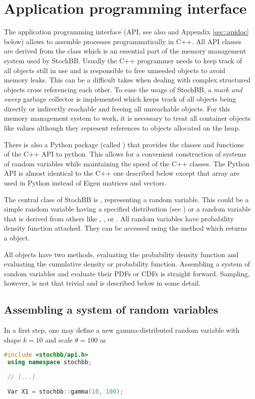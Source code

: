 \section{Application programming interface} \label{sec:api}
The application programming interface (API, see also \cite{stochbbapi} and Appendix 
\ref{sec::apidoc} below) allows to assemble processes programmatically in C++.
All API classes are derived from the  class which is an essential part of the
memory management system used by StochBB. Usually the C++ programmer needs to keep track of all
objects still in use and is responsible to free unneeded objects to avoid memory leaks. This can
be a difficult takes when dealing with complex structured objects cross referencing each other.
To ease the usage of StochBB, a \emph{mark and sweep} garbage collector is implemented which keeps track
of all objects being directly or indirectly reachable and freeing all unreachable objects. For
this memory management system to work, it is necessary to treat all container objects like values
although they represent references to objects allocated on the heap.

There is also a Python package (called ) that provides the classes and functions 
of the C++ API to python. This allows for a convenient construction of systems of random variables
while maintaining the speed of the C++ classes. The Python API is almost identical to the C++ one
described below except that  array are used in Python instead of Eigen matrices and 
vectors.

The central class of StochBB is , representing a random variable. This could be a
simple random variable having a specified distribution (see ) or a random
variable that is derived from others like , ,  or
. All random variables have probability density function attached. They can be accessed
using the  method which returns a  object.

All  objects have two methods,  evaluating the probability
density function and  evaluating the cumulative density or probability
function. Assembling a system of random variables and evaluate their PDFs or CDFs is straight
forward. Sampling, however, is not that trivial and is described below in some detail.

\subsection{Assembling a system of random variables}
In a first step, one may define a new gamma-distributed random variable with shape $k=10$
and scale $\theta=100$ as
\begin{lstlisting}[language=C++]
 #include <stochbb/api.h>
 using namespace stochbb;
 
 // [...]
 
 Var X1 = stochbb::gamma(10, 100);
\end{lstlisting}

